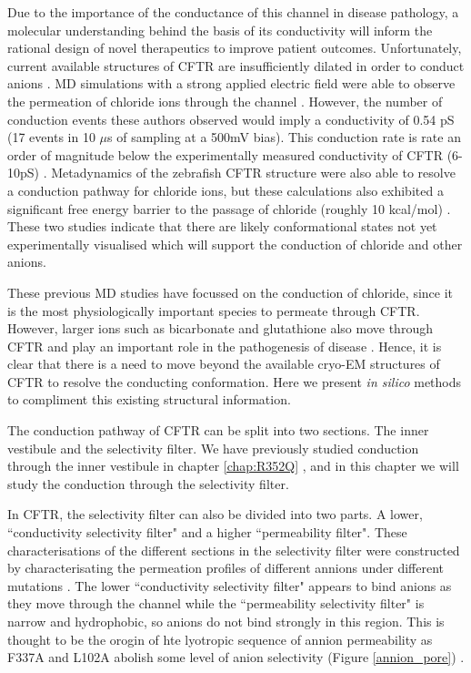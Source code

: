 Due to the importance of the conductance of this channel in disease pathology, a molecular understanding behind the basis of its conductivity will inform the rational design of novel therapeutics to improve patient outcomes. Unfortunately, current available structures of CFTR are insufficiently dilated in order to conduct anions \cite{zhang2018}. MD simulations with a strong applied electric field were able to observe the permeation of chloride ions through the channel \cite{}. However, the number of conduction events these authors observed would imply a conductivity of 0.54 pS (17 events in 10 $\mu$s of sampling at a 500mV bias). This conduction rate is rate an order of magnitude below the experimentally measured conductivity of CFTR (6-10pS) \cite{gong2004, lee2007, linsdell2001, sheppard1999}. Metadynamics of the zebrafish CFTR structure were also able to resolve a conduction pathway for chloride ions, but these calculations also exhibited a significant free energy barrier to the  passage of chloride (roughly 10 kcal/mol) \cite{farkas2020}. These two studies indicate that there are likely conformational states not yet experimentally visualised which will support the conduction of chloride and other anions. 

These previous MD studies have focussed on the conduction of chloride, since it is the most physiologically important species to permeate through CFTR. However, larger ions such as bicarbonate and glutathione also move through CFTR and play an important role in the pathogenesis of disease \cite{gao1999, kogan2003, linsdell1998, tang2009, larusch2014, jun2016}. Hence, it is clear that there is a need to move beyond the available cryo-EM structures of CFTR to resolve the conducting conformation. Here we present \textit{in silico} methods to compliment this existing structural information. 

The conduction pathway of CFTR can be split into two sections. The inner vestibule and the selectivity filter. We have previously studied conduction through the inner vestibule in chapter \ref{chap:R352Q} \cite{wong2022a}, and in this chapter we will study the conduction through the selectivity filter. 

In CFTR, the selectivity filter can also be divided into two parts. A lower, ``conductivity selectivity filter" and a higher ``permeability filter". These characterisations of the different sections in the selectivity filter were constructed by characterisating the permeation profiles of different annions under different mutations \cite{linsdell2016}. The lower ``conductivity selectivity filter" appears to bind anions as they move through the channel while the ``permeability selectivity filter" is narrow and hydrophobic, so anions do not bind strongly in this region. This is thought to be the orogin of hte lyotropic sequence of annion permeability as F337A and L102A abolish some level of anion selectivity (Figure \ref{annion_pore}) \cite{}. 


